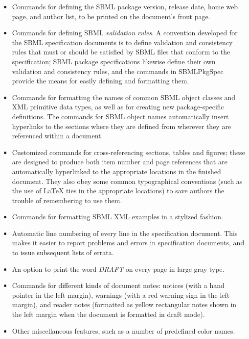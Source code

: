 \documentclass{bmcart}
\newcommand{\sbmlpkg}{SBMLPkgSpec}
\begin{document}
\begin{itemize}

\item Commands for defining the SBML package version, release date, home web page, and author list, to be printed on the document's front page.

\item Commands for defining SBML \emph{validation rules}.  A convention developed for the SBML specification documents is to define validation and consistency rules that must or should be satisfied by SBML files that conform to the specification; SBML package specifications likewise define their own validation and consistency rules, and the commands in \sbmlpkg{} provide the means for easily defining and formatting them.

\item Commands for formatting the names of common SBML object classes and XML primitive data types, as well as for creating new package-specific definitions.  The commands for SBML object names automatically insert hyperlinks to the sections where they are defined from wherever they are  referenced within a document.

\item Customized commands for cross-referencing sections, tables and figures; these are designed to produce both item number and page references that are automatically hyperlinked to the appropriate locations in the finished document. They also obey some common typographical conventions (such as the use of LaTeX ties in the appropriate locations) to save authors the trouble of remembering to use them.

\item Commands for formatting SBML XML examples in a stylized fashion.

\item Automatic line numbering of every line in the specification document. This makes it easier to report problems and errors in specification documents, and to issue subsequent lists of errata.

\item An option to print the word \emph{DRAFT} on every page in large gray type.

\item Commands for different kinds of document notes: notices (with a hand pointer in the left margin), warnings (with a red warning sign in the left margin), and reader notes (formatted as yellow rectangular notes shown in the left margin when the document is formatted in draft mode).

\item Other miscellaneous features, such as a number of predefined color names.

\end{itemize}
\end{document}
